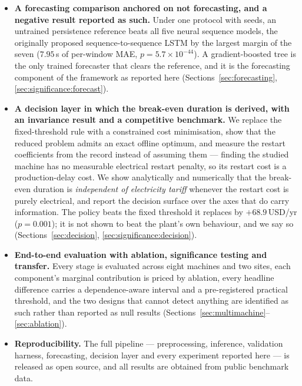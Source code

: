 \begin{itemize}
  \item \textbf{A forecasting comparison anchored on not forecasting,
  and a negative result reported as such.} Under one protocol with
  seeds, an untrained persistence reference beats all five neural
  sequence models, the originally proposed sequence-to-sequence LSTM by
  the largest margin of the seven ($7.95$\,s of per-window MAE,
  $p=5.7\times10^{-44}$). A gradient-boosted tree is the only trained
  forecaster that clears the reference, and it is the forecasting
  component of the framework as reported here
  (Sections~\ref{sec:forecasting}, \ref{sec:significance:forecast}).

  \item \textbf{A decision layer in which the break-even duration is
  derived, with an invariance result and a competitive benchmark.} We
  replace the fixed-threshold rule with a constrained cost
  minimisation, show that the reduced problem admits an exact offline
  optimum, and measure the restart coefficients from the record instead
  of assuming them --- finding the studied machine has no measurable
  electrical restart penalty, so its restart cost is a production-delay
  cost. We show analytically and numerically that the break-even
  duration is \emph{independent of electricity tariff} whenever the
  restart cost is purely electrical, and report the decision surface
  over the axes that do carry information. The policy beats the fixed
  threshold it replaces by $+68.9$\,USD/yr ($p=0.001$); it is not shown
  to beat the plant's own behaviour, and we say so
  (Sections~\ref{sec:decision}, \ref{sec:significance:decision}).

  \item \textbf{End-to-end evaluation with ablation, significance
  testing and transfer.} Every stage is evaluated across eight machines
  and two sites, each component's marginal contribution is priced by
  ablation, every headline difference carries a dependence-aware
  interval and a pre-registered practical threshold, and the two designs
  that cannot detect anything are identified as such rather than
  reported as null results (Sections~\ref{sec:multimachine}--\ref{sec:ablation}).

  \item \textbf{Reproducibility.} The full pipeline --- preprocessing,
  inference, validation harness, forecasting, decision layer and every
  experiment reported here --- is released as open source, and all
  results are obtained from public benchmark data.
\end{itemize}

